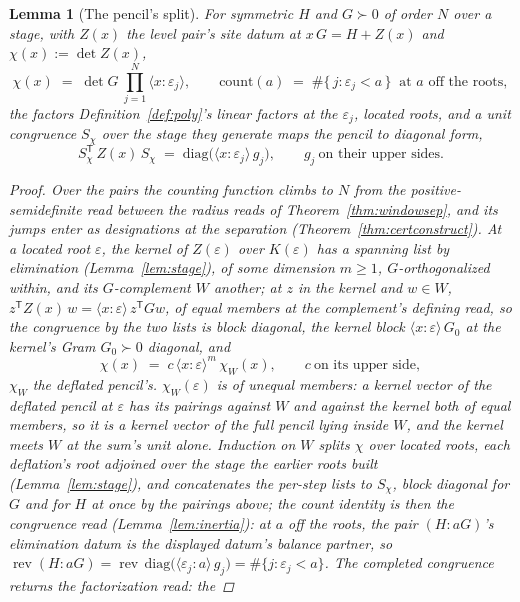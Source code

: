 \documentclass[11pt]{article}
\newtheorem{lemma}{Lemma}
\theoremstyle{definition}
\begin{document}
\begin{lemma}[The pencil's split]\label{lem:split}
For symmetric $H$ and $G\succ0$ of order $N$ over a
stage, with $Z(x)$ the level pair's site datum at $x\,G=H+Z(x)$ and
$\chi(x):=\det Z(x)$,
\[
\chi(x)\;=\;\det G\ \prod_{j=1}^N\langle x\!:\!\varepsilon_j\rangle,
\qquad
\mathrm{count}(a)\;=\;\#\{\,j:\varepsilon_j<a\,\}
\ \text{ at $a$ off the roots},
\]
the factors Definition~\ref{def:poly}'s linear factors at the
$\varepsilon_j$, located roots, and a unit congruence $S_\chi$ over the
stage they generate maps the pencil to diagonal form,
\[
S_\chi^{\mathsf T}\,Z(x)\,S_\chi\;=\;
\mathrm{diag}\big(\langle x\!:\!\varepsilon_j\rangle\,g_j\big),
\qquad g_j\ \text{on their upper sides}.
\]
\begin{proof}
Over the pairs the counting function climbs to $N$ from the
positive-semidefinite read between the radius reads of
Theorem~\ref{thm:windowsep}, and its jumps enter as designations at
the separation (Theorem~\ref{thm:certconstruct}). At a located root $\varepsilon$, the
kernel of $Z(\varepsilon)$ over $K(\varepsilon)$ has a spanning list by
elimination (Lemma~\ref{lem:stage}), of some dimension $m\ge1$, $G$-orthogonalized within,
and its $G$-complement $W$ another; at $z$ in the kernel and $w\in W$,
$z^{\mathsf T}Z(x)\,w=\langle x\!:\!\varepsilon\rangle\,z^{\mathsf T}Gw$,
of equal members at the complement's defining read, so the
congruence by the two lists is block diagonal, the kernel block
$\langle x\!:\!\varepsilon\rangle\,G_0$ at the kernel's Gram $G_0\succ0$ diagonal, and
\[
\chi(x)\;=\;c\,\langle x\!:\!\varepsilon\rangle^m\,\chi_W(x),\qquad
c\ \text{on its upper side},
\]
$\chi_W$ the deflated pencil's. $\chi_W(\varepsilon)$ is of unequal
members: a kernel vector
of the deflated pencil at $\varepsilon$ has its pairings against $W$ and
against the kernel both of equal members, so it is a kernel vector of the full
pencil lying inside $W$, and the kernel meets $W$ at the sum's unit alone.
Induction on $W$ splits $\chi$ over located roots, each
deflation's root adjoined over the stage the earlier roots built
(Lemma~\ref{lem:stage}), and concatenates the per-step lists to
$S_\chi$, block diagonal for $G$ and for $H$ at once by
the pairings above; the count identity is then the congruence read
(Lemma~\ref{lem:inertia}): at $a$ off the roots, the pair
$(H\!:\!aG)$'s elimination datum is the displayed datum's
balance partner, so
$\operatorname{rev}(H\!:\!aG)=\operatorname{rev}\,
\mathrm{diag}\big(\langle\varepsilon_j\!:\!a\rangle\,g_j\big)=\#\{j:\varepsilon_j<a\}$.
The completed congruence returns the factorization read: the

\end{proof}
\end{lemma}
\end{document}
